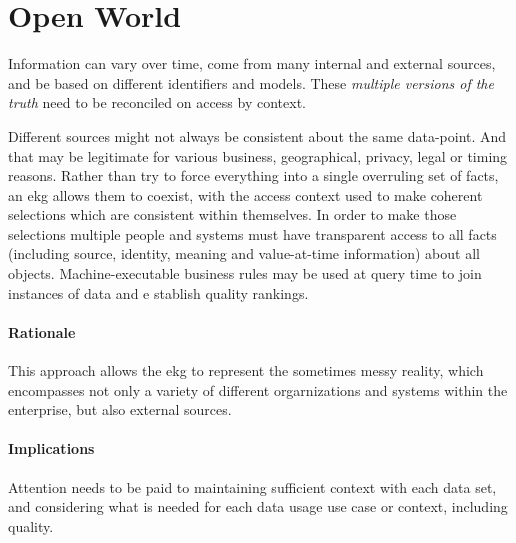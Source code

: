 \section{Open World}\label{sec:ekg-principle-open-world}

Information can vary over time, come from many internal and external sources, 
and be based on different identifiers and models. 
These \textit{multiple versions of the truth} need to be reconciled on access by context.

Different sources might not always be consistent about the same \gls{data-point}. 
And that may be legitimate for various business, geographical, privacy, legal or timing reasons. 
Rather than try to force everything into a single overruling set of facts, 
an \gls{ekg} allows them to coexist, with the access context used to make 
coherent selections which are consistent within themselves.
In order to make those selections multiple people and systems must have transparent access 
to all facts (including source, identity, meaning and value-at-time information) about all objects.
Machine-executable business rules may be used at query time to join instances of data and e
stablish quality rankings.

\paragraph{Rationale}

This approach allows the \gls{ekg} to represent the sometimes messy reality, which encompasses 
not only a variety of different orgarnizations and systems within the enterprise, but also external sources.

\paragraph{Implications}

Attention needs to be paid to maintaining sufficient context with each data set, 
and considering what is needed for each data usage use case or context, including quality.
